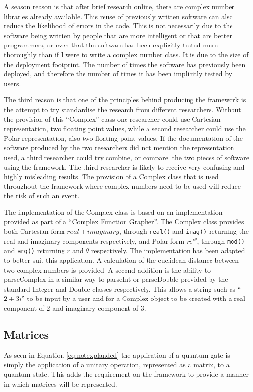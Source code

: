 A season reason is that after brief research online, there are complex number libraries already available.
This reuse of previously written software can also reduce the likelihood of errors in the code.
This is not necessarily due to the software being written by people that are more intelligent or that are better programmers, or even that the software has been explicitly tested more thoroughly than if I were to write a complex number class.
It is due to the size of the deployment footprint.
The number of times the software has previously been deployed, and therefore the number of times it has been implicitly tested by users.

The third reason is that one of the principles behind producing the framework is the attempt to try standardise the research from different researchers.
Without the provision of this ``Complex'' class one researcher could use Cartesian representation, two floating point values, while a second researcher could use the Polar representation, also two floating point values.
If the documentation of the software produced by the two researchers did not mention the representation used, a third researcher could try combine, or compare, the two pieces of software using the framework.
The third researcher is likely to receive very confusing and highly misleading results.
The provision of a Complex class that is used throughout the framework where complex numbers need to be used will reduce the risk of such an event.

The implementation of the Complex class is based on an implementation provided as part of a ``Complex Function Grapher''\cite{compimp}.
The Complex class provides both Cartesian form $real + imaginary$, through \lstinline{real()} and \lstinline{imag()} returning the real and imaginary components respectively, and Polar form $re^{i\theta}$, through \lstinline{mod()} and \lstinline{arg()} returning $r$ and $\theta$ respectively.
The implementation has been adapted to better suit this application.
A calculation of the euclidean distance between two complex numbers is provided.
A second addition is the ability to parseComplex in a similar way to parseInt or parseDouble provided by the standard Integer and Double classes respectively.
This allows a string such as ``$2+3i$'' to be input by a user and for a Complex object to be created with a real component of $2$ and imaginary component of $3$.

\subsection{Matrices}
As seen in Equation \ref{eq:notexplanded} the application of a quantum gate is simply the application of a unitary operation, represented as a matrix, to a quantum state.
This adds the requirement on the framework to provide a manner in which matrices will be represented.

